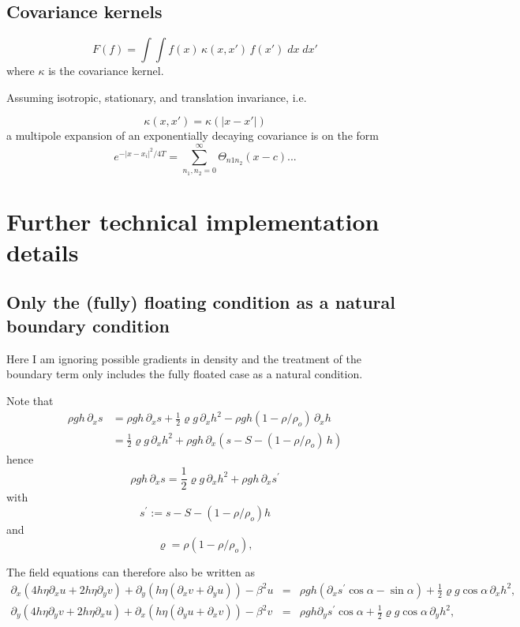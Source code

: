 \documentclass[10pt,a4paper]{book}
\newcommand{\p}{\partial}
\begin{document}
\section{Covariance kernels}


\[
F(f)= \int \int f(x) \, \kappa(x,x') \, f(x') \;dx \; dx' 
\]
where $\kappa$ is the covariance kernel.



Assuming isotropic, stationary, and translation invariance, i.e.

\[
\kappa(x,x')=\kappa(|x-x'|)
\]
a multipole expansion of an exponentially decaying covariance is on the form
\[e^{-|x-x_i|^2/4T}=\sum_{n_1,n_2=0}^{\infty} \Theta_{n1 n_2} (x-c) ...
\]



\chapter{Further technical implementation details}
 
\section{Only the (fully) floating condition as a natural boundary condition}

Here I am ignoring possible gradients in density and the treatment of
the boundary term only includes the fully floated case as a natural condition.


Note that
\begin{align*}
\rho g h \, \p_x s &=\rho g h \, \p_x s + \frac{1}{2} \varrho g \,\p_x h^2 - \rho g h (1-\rho/\rho_o)\, \p_x h \\
&=\frac{1}{2} \varrho g \,\p_x h^2 +\rho g h \, \p_x ( s -S - (1-\rho/\rho_o)\,  h )
\end{align*}
hence
\begin{equation}
\rho g h \, \p_x s =\frac{1}{2} \varrho g \,\p_x h^2 +\rho g h \, \p_x s^{'}
\label{eq:sdot}
\end{equation}
with
\[ 
s^{'} := s-S -(1-\rho/\rho_o) h 
 \]
and
\[
\varrho=\rho (1-\rho/\rho_o) ,
\]


The field equations can therefore also be written as
\begin{eqnarray} 
\p_x ( 4 h \eta \p_x u + 2 h \eta \p_y v) + \p_y ( h \eta (\p_x v + \p_y u)) - \beta^2 u 
&=&\rho g h (\p_x s^{'} \cos \alpha  -  \sin \alpha )    + \frac{1}{2} \varrho g  \cos \alpha \, \p_x h^2,\nonumber \\
\p_y ( 4 h \eta \p_y v + 2 h \eta \p_x u) +\p_x ( h \eta (\p_y u + \p_x v)) - \beta^2 v 
&=&\rho g h \p_y s^{'} \cos \alpha  +\frac{1}{2} \varrho g  \cos \alpha \, \p_y h^2 , \nonumber
\end{eqnarray}
\end{document}
